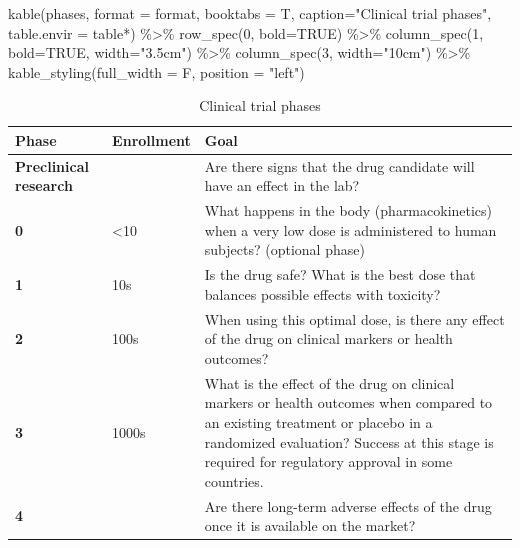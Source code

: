\documentclass[
  letterpaper,
  DIV=11,
  numbers=noendperiod,
  oneside]{scrartcl}
\newenvironment{Shaded}{\begin{snugshade}}{\end{snugshade}}
\newcommand{\AttributeTok}[1]{\textcolor[rgb]{0.40,0.45,0.13}{#1}}
\newcommand{\ConstantTok}[1]{\textcolor[rgb]{0.56,0.35,0.01}{#1}}
\newcommand{\DecValTok}[1]{\textcolor[rgb]{0.68,0.00,0.00}{#1}}
\newcommand{\FunctionTok}[1]{\textcolor[rgb]{0.28,0.35,0.67}{#1}}
\newcommand{\NormalTok}[1]{\textcolor[rgb]{0.00,0.23,0.31}{#1}}
\newcommand{\SpecialCharTok}[1]{\textcolor[rgb]{0.37,0.37,0.37}{#1}}
\newcommand{\StringTok}[1]{\textcolor[rgb]{0.13,0.47,0.30}{#1}}
\begin{document}
\begin{Shaded}
\begin{Highlighting}[]
\FunctionTok{kable}\NormalTok{(phases, }\AttributeTok{format =}\NormalTok{ format, }\AttributeTok{booktabs =}\NormalTok{ T,}
\AttributeTok{caption=}\StringTok{"Clinical trial phases"}\NormalTok{, }\AttributeTok{table.envir =} \StringTok{\textquotesingle{}table*\textquotesingle{}}\NormalTok{) }\SpecialCharTok{\%\textgreater{}\%}
  \FunctionTok{row\_spec}\NormalTok{(}\DecValTok{0}\NormalTok{, }\AttributeTok{bold=}\ConstantTok{TRUE}\NormalTok{) }\SpecialCharTok{\%\textgreater{}\%}
  \FunctionTok{column\_spec}\NormalTok{(}\DecValTok{1}\NormalTok{, }\AttributeTok{bold=}\ConstantTok{TRUE}\NormalTok{, }\AttributeTok{width=}\StringTok{"3.5cm"}\NormalTok{) }\SpecialCharTok{\%\textgreater{}\%}
  \FunctionTok{column\_spec}\NormalTok{(}\DecValTok{3}\NormalTok{, }\AttributeTok{width=}\StringTok{"10cm"}\NormalTok{) }\SpecialCharTok{\%\textgreater{}\%}  
    \FunctionTok{kable\_styling}\NormalTok{(}\AttributeTok{full\_width =}\NormalTok{ F, }\AttributeTok{position =} \StringTok{"left"}\NormalTok{)}
\end{Highlighting}
\end{Shaded}

\begin{table}

\caption{Clinical trial phases}
\begin{tabular}[t]{>{\raggedright\arraybackslash}p{3.5cm}l>{\raggedright\arraybackslash}p{10cm}}
\toprule
\textbf{Phase} & \textbf{Enrollment} & \textbf{Goal}\\
\midrule
\textbf{Preclinical research} &  & Are there signs that the drug candidate will have an effect in the lab?\\
\textbf{0} & <10 & What happens in the body (pharmacokinetics) when a very low dose is administered to human subjects? (optional phase)\\
\textbf{1} & 10s & Is the drug safe? What is the best dose that balances possible effects with toxicity?\\
\textbf{2} & 100s & When using this optimal dose, is there any effect of the drug on clinical markers or health outcomes?\\
\textbf{3} & 1000s & What is the effect of the drug on clinical markers or health outcomes when compared to an existing treatment or placebo in a randomized evaluation? Success at this stage is required for regulatory approval in some countries.\\
\addlinespace
\textbf{4} &  & Are there long-term adverse effects of the drug once it is available on the market?\\
\bottomrule
\end{tabular}
\end{table}
\end{document}

